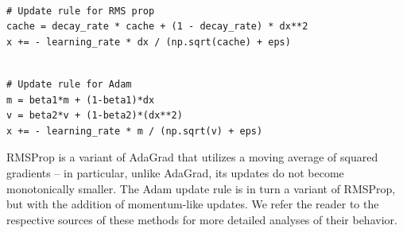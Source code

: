 \documentclass{tufte-handout}
\begin{document}
\begin{theorem}
\begin{verbatim}

# Update rule for RMS prop
cache = decay_rate * cache + (1 - decay_rate) * dx**2
x += - learning_rate * dx / (np.sqrt(cache) + eps)
\end{verbatim}
\label{snip:rmsprop}
\end{theorem}

\begin{theorem}
\begin{verbatim}

# Update rule for Adam
m = beta1*m + (1-beta1)*dx
v = beta2*v + (1-beta2)*(dx**2)
x += - learning_rate * m / (np.sqrt(v) + eps)
\end{verbatim}
\label{snip:adam}
\end{theorem}
RMSProp is a variant of AdaGrad that utilizes a moving average of squared gradients -- in particular, unlike AdaGrad, its updates do not become monotonically smaller. The Adam update rule is in turn a variant of RMSProp, but with the addition of momentum-like updates. We refer the reader to the respective sources of these methods for more detailed analyses of their behavior.
\end{document}
